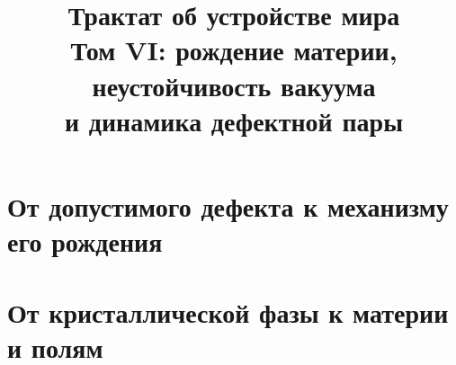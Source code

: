 \documentclass[12pt,a4paper]{report}
\title{Трактат об устройстве мира\\
Том VI: рождение материи, неустойчивость вакуума\\
и динамика дефектной пары}
\author{}
\date{}
\theoremstyle{remark}
\begin{document}
\hypersetup{pageanchor=false}
\maketitle
\clearpage
\hypersetup{pageanchor=true}
\setcounter{page}{1}
\tableofcontents
\clearpage
{}

\part{От допустимого дефекта к механизму его рождения}





























\part{От кристаллической фазы к материи и полям}
\end{document}
